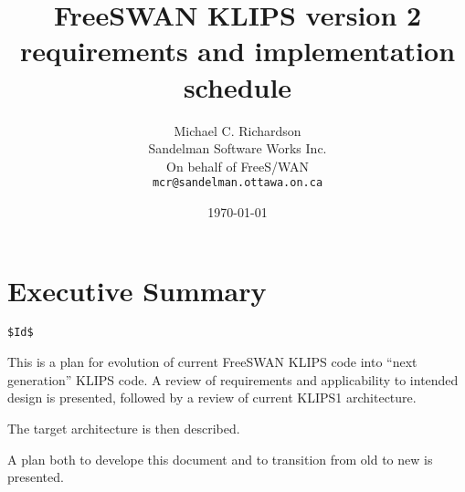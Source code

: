 \documentclass[titlepage]{article}
\author{Michael C. Richardson\\
	Sandelman Software Works Inc.\\
	On behalf of FreeS/WAN\\
	{\tt mcr@sandelman.ottawa.on.ca}}
\date{\today}
\title{FreeSWAN KLIPS version 2 requirements and implementation schedule}
\begin{document}
\maketitle\newpage

\section{Executive Summary}

\begin{verbatim}
$Id$
\end{verbatim}

This is a plan for evolution of current FreeSWAN KLIPS code into ``next
generation'' KLIPS code. A review of requirements and applicability to
intended design is presented, followed by a review of current KLIPS1
architecture.

The target architecture is then described.

A plan both to develope this document and to transition from old to new is
presented.









\end{document}
